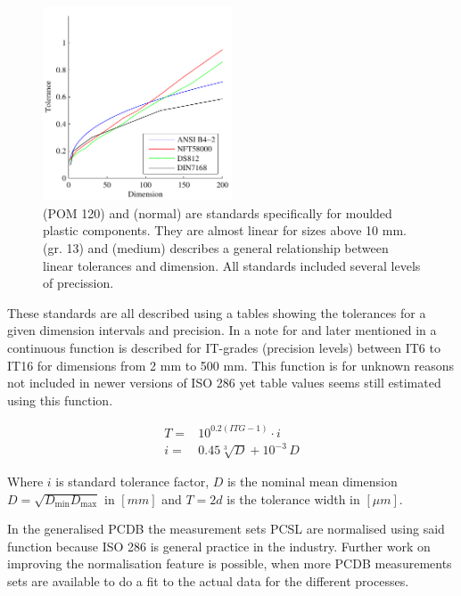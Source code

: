 \documentclass[aip,amsmath, reprint, author-year]{revtex4-1}
\begin{document}
\begin{figure}
\includegraphics[width=0.5\textwidth]{Tolerance_standards.pdf}
\caption{\label{fig:tolstd} \citeauthor{DIN16901} (POM 120) and \citeauthor{NFT58000} (normal) are standards specifically for moulded plastic components. They are almost linear for sizes above 10 mm. 
\citeauthor{american1978preferred} (gr. 13) and \citeauthor{DIN7168} (medium) describes a general relationship between linear tolerances and dimension. All standards included several levels of precission.}
\end{figure}

These standards are all described using a tables showing the tolerances for a given dimension intervals and precision. 
In a note for \citeauthor{american1978preferred} and later mentioned in \citeauthor{ISO286} a continuous function is described for IT-grades (precision levels) between IT6 to IT16 for dimensions from 2 mm to 500 mm. This function is for unknown reasons not included in newer versions of ISO 286 yet table values seems still estimated using this function.

\begin{align}
	T =& 10^{0.2 (ITG -1)} \cdot i \\
	i =& 0.45 \sqrt[3]{D} + 10^{-3} \, D 
\end{align}

Where $i$ is standard tolerance factor, $D$ is the nominal mean dimension $D = \sqrt{D_{\textrm{min}} D_\textrm{max}}$ in $[mm]$ and $T = 2 d$ is the tolerance width in $[\mu m]$. 

In the generalised PCDB the measurement sets PCSL are normalised using said function because ISO 286 is general practice in the industry. 
Further work on improving the normalisation feature is possible, when more PCDB measurements sets are available to do a fit to the actual data for the different processes.
\end{document}
